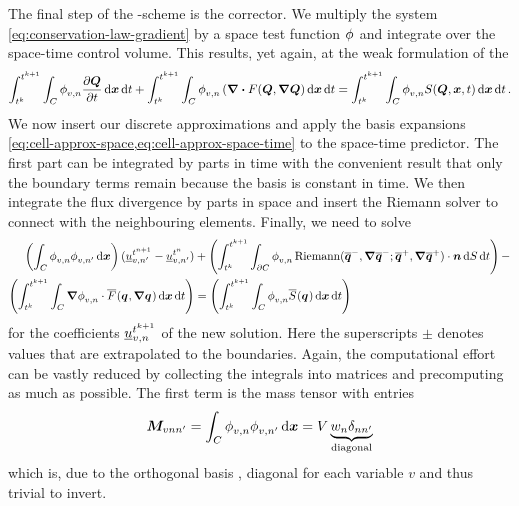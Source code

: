 The final step of the \aderdg{}-scheme is the corrector.
We multiply the system \cref{eq:conservation-law-gradient} by a space test function $\stestfunction$ and integrate over the space-time control volume.
This results, yet again, at the weak formulation of the \pde{}
\begin{equation}
  \label{eq:weak-pde}
\intdt{\intdcell{
\stestfunction[][v,n] \pdv{\Q}{t}
}}
+
\intdt{\intdcell{
    \stestfunction[][v,n] \left( \div{F(\Q, \gradQ } \right)
}}
=
\intdt{\intdcell{
    \stestfunction[][v,n] S(\Q, \bm{x}, t)
}}.
\end{equation}
We now insert our discrete approximations and apply the basis expansions \cref{eq:cell-approx-space,eq:cell-approx-space-time} to the space-time predictor.
The first part can be integrated by parts in time with the convenient result that only the boundary terms remain because the basis is constant in time.
We then integrate the flux divergence by parts in space and insert the Riemann solver to connect with the neighbouring elements.
Finally, we need to solve
\newcommand{\massMatrixDef}{\intdcell{
  \stestfunction[][v,n] \sbasis[][v,n']
}}
\begin{align}
\begin{split}
\label{eq:corrector}
\left(
\massMatrixDef
\right)
(\ssolCoeff[t^{n+1}][v,n'] - \ssolCoeff[t^n][v,n'])
&+
\left(\intdt{\intdcellb{
      \stestfunction[][v,n] \Riemann(\stpredictor[-], \gradient{\stpredictor[-]}; \stpredictor[+], \gradient{\stpredictor[+]}) \cdot \normal
}}\right)
-\\
\left(\intdt{\intdcell{
    \gradient{\stestfunction[][v,n]} \cdot  \stflux(\spredictor, \gradient{\spredictor})
}}\right)
&=
\left(\intdt{\intdcell{
      \stestfunction[][v,n] \stsource(\spredictor)
}}\right)
\end{split}
\end{align}
for the coefficients $\ssolCoeff[\nextTime][v,n]$ of the new solution.
Here the superscripts $\pm$ denotes values that are extrapolated to the boundaries.
Again, the computational effort can be vastly reduced by collecting the integrals into matrices and precomputing as much as possible.
The first term is the mass tensor with entries
\newcommand{\massMatrix}[1][]{\bm{M}_{#1}}
\begin{equation}
  \label{eq:mass-matrix}
  \massMatrix[v n n'] = \massMatrixDef = \volume \underbrace{\quadWeight[n] \delta_{n n'}}_{\text{diagonal}}
\end{equation}
which is, due to the orthogonal basis , diagonal for each variable $v$ and thus trivial to invert.
